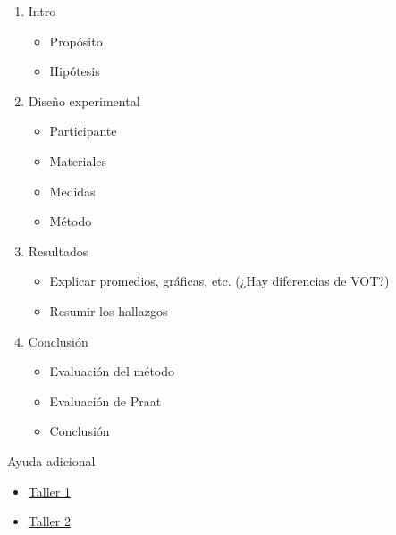 \documentclass[12pt]{article}
\begin{document}
\begin{enumerate}
	\item Intro
	\begin{itemize}
		\item Propósito
		\item Hipótesis
	\end{itemize}
	\item Diseño experimental
	\begin{itemize}
		\item Participante
		\item Materiales
		\item Medidas
		\item Método
	\end{itemize}
	\item Resultados
	\begin{itemize}
		\item Explicar promedios, gráficas, etc. (¿Hay diferencias de VOT?)
		\item Resumir los hallazgos
	\end{itemize}
	\item Conclusión
	\begin{itemize}
		\item Evaluación del método
		\item Evaluación de Praat
		\item Conclusión
	\end{itemize}
\end{enumerate}


\noindent Ayuda adicional

\begin{itemize}
	\item \href{https://www.jvcasillas.com/praat/slides/00_intro/index.html}{Taller 1}
	\item \href{https://www.jvcasillas.com/praat/slides/01_vot/index.html}{Taller 2}
\end{itemize}
\end{document}

